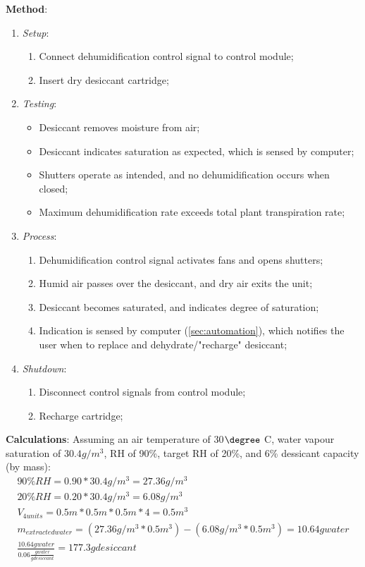 \textbf{Method}:
\begin{enumerate}
    \item \textit{Setup}:
    \begin{enumerate}
        \item Connect dehumidification control signal to control module;
        \item Insert dry desiccant cartridge;
    \end{enumerate}
    \item \textit{Testing}:
    \begin{itemize}
        \item Desiccant removes moisture from air;
        \item Desiccant indicates saturation as expected, which is sensed by computer;
        \item Shutters operate as intended, and no dehumidification occurs when closed;
        \item Maximum dehumidification rate exceeds total plant transpiration rate;
    \end{itemize}
    \item \textit{Process}:
    \begin{enumerate}
        \item Dehumidification control signal activates fans and opens shutters;
        \item Humid air passes over the desiccant, and dry air exits the unit;
        \item Desiccant becomes saturated, and indicates degree of saturation;
        \item Indication is sensed by computer (\ref{sec:automation}), which notifies the user when to replace and dehydrate/"recharge" desiccant;
    \end{enumerate}
    \item \textit{Shutdown}:
    \begin{enumerate}
        \item Disconnect control signals from control module;
        \item Recharge cartridge;
    \end{enumerate}
\end{enumerate}

\textbf{Calculations}:
Assuming an air temperature of 30$\degree$ C, water vapour saturation of $30.4g/m^{3}$, RH of 90\%, target RH of 20\%, and 6\% dessicant capacity (by mass):
\vspace{.05cm}
\begin{gather*}
    90\% RH = 0.90 * 30.4g/m^{3} = 27.36g/m^{3} \\
    20\% RH = 0.20 * 30.4g/m^{3} = 6.08g/m^{3} \\
    V_{4 units} = 0.5m * 0.5m * 0.5m * 4 = 0.5m^{3} \\
    m_{extracted water} = (27.36g/m^{3} * 0.5m^{3}) - (6.08g/m^{3} * 0.5m^{3}) = 10.64g water \\
    \frac{10.64g water}{0.06 \frac{g water}{g desiccant}} = 177.3g desiccant \\
\end{gather*}

